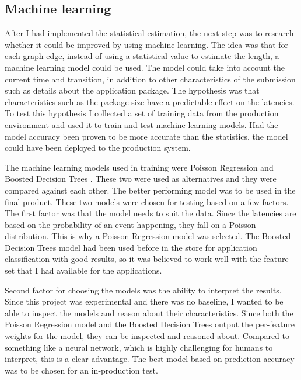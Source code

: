 \subsection{Machine learning}
\label{sec:ml-estimation}

After I had implemented the statistical estimation, the next step was to research whether it could be improved by using machine learning. 
The idea was that for each graph edge, instead of using a statistical value to estimate the length, a machine learning model could be used.
The model could take into account the current time and transition, in addition to other characteristics of the submission such as details about the application package.
The hypothesis was that characteristics such as the package size have a predictable effect on the latencies.
To test this hypothesis I collected a set of training data from the production environment and used it to train and test machine learning models.
Had the model accuracy been proven to be more accurate than the statistics, the model could have been deployed to the production system.

The machine learning models used in training were Poisson Regression \cite{azurepoisson} and Boosted Decision Trees \cite{azurebdt}.
These two were used as alternatives and they were compared against each other.
The better performing model was to be used in the final product.
These two models were chosen for testing based on a few factors.
The first factor was that the model needs to suit the data.
Since the latencies are based on the probability of an event happening, they fall on a Poisson distribution. 
This is why a Poisson Regression model was selected.
The Boosted Decision Trees model had been used before in the store for application classification with good results, so it was believed to work well with the feature set that I had available for the applications.

Second factor for choosing the models was the ability to interpret the results.
Since this project was experimental and there was no baseline, I wanted to be able to inspect the models and reason about their characteristics.
Since both the Poisson Regression model and the Boosted Decision Trees output the per-feature weights for the model, they can be inspected and reasoned about.
Compared to something like a neural network, which is highly challenging for humans to interpret, this is a clear advantage.
The best model based on prediction accuracy was to be chosen for an in-production test.

